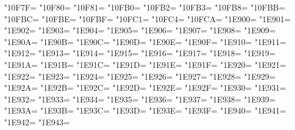 \XeTeXcharclass"10F7F=\KclassArabD
\XeTeXcharclass"10F80=\KclassArabD
\XeTeXcharclass"10F81=\KclassArabD
\XeTeXcharclass"10FB0=\KclassArabD
\XeTeXcharclass"10FB2=\KclassArabD
\XeTeXcharclass"10FB3=\KclassArabD
\XeTeXcharclass"10FB8=\KclassArabD
\XeTeXcharclass"10FBB=\KclassArabD
\XeTeXcharclass"10FBC=\KclassArabD
\XeTeXcharclass"10FBE=\KclassArabD
\XeTeXcharclass"10FBF=\KclassArabD
\XeTeXcharclass"10FC1=\KclassArabD
\XeTeXcharclass"10FC4=\KclassArabD
\XeTeXcharclass"10FCA=\KclassArabD
\XeTeXcharclass"1E900=\KclassArabD
\XeTeXcharclass"1E901=\KclassArabD
\XeTeXcharclass"1E902=\KclassArabD
\XeTeXcharclass"1E903=\KclassArabD
\XeTeXcharclass"1E904=\KclassArabD
\XeTeXcharclass"1E905=\KclassArabD
\XeTeXcharclass"1E906=\KclassArabD
\XeTeXcharclass"1E907=\KclassArabD
\XeTeXcharclass"1E908=\KclassArabD
\XeTeXcharclass"1E909=\KclassArabD
\XeTeXcharclass"1E90A=\KclassArabD
\XeTeXcharclass"1E90B=\KclassArabD
\XeTeXcharclass"1E90C=\KclassArabD
\XeTeXcharclass"1E90D=\KclassArabD
\XeTeXcharclass"1E90E=\KclassArabD
\XeTeXcharclass"1E90F=\KclassArabD
\XeTeXcharclass"1E910=\KclassArabD
\XeTeXcharclass"1E911=\KclassArabD
\XeTeXcharclass"1E912=\KclassArabD
\XeTeXcharclass"1E913=\KclassArabD
\XeTeXcharclass"1E914=\KclassArabD
\XeTeXcharclass"1E915=\KclassArabD
\XeTeXcharclass"1E916=\KclassArabD
\XeTeXcharclass"1E917=\KclassArabD
\XeTeXcharclass"1E918=\KclassArabD
\XeTeXcharclass"1E919=\KclassArabD
\XeTeXcharclass"1E91A=\KclassArabD
\XeTeXcharclass"1E91B=\KclassArabD
\XeTeXcharclass"1E91C=\KclassArabD
\XeTeXcharclass"1E91D=\KclassArabD
\XeTeXcharclass"1E91E=\KclassArabD
\XeTeXcharclass"1E91F=\KclassArabD
\XeTeXcharclass"1E920=\KclassArabD
\XeTeXcharclass"1E921=\KclassArabD
\XeTeXcharclass"1E922=\KclassArabD
\XeTeXcharclass"1E923=\KclassArabD
\XeTeXcharclass"1E924=\KclassArabD
\XeTeXcharclass"1E925=\KclassArabD
\XeTeXcharclass"1E926=\KclassArabD
\XeTeXcharclass"1E927=\KclassArabD
\XeTeXcharclass"1E928=\KclassArabD
\XeTeXcharclass"1E929=\KclassArabD
\XeTeXcharclass"1E92A=\KclassArabD
\XeTeXcharclass"1E92B=\KclassArabD
\XeTeXcharclass"1E92C=\KclassArabD
\XeTeXcharclass"1E92D=\KclassArabD
\XeTeXcharclass"1E92E=\KclassArabD
\XeTeXcharclass"1E92F=\KclassArabD
\XeTeXcharclass"1E930=\KclassArabD
\XeTeXcharclass"1E931=\KclassArabD
\XeTeXcharclass"1E932=\KclassArabD
\XeTeXcharclass"1E933=\KclassArabD
\XeTeXcharclass"1E934=\KclassArabD
\XeTeXcharclass"1E935=\KclassArabD
\XeTeXcharclass"1E936=\KclassArabD
\XeTeXcharclass"1E937=\KclassArabD
\XeTeXcharclass"1E938=\KclassArabD
\XeTeXcharclass"1E939=\KclassArabD
\XeTeXcharclass"1E93A=\KclassArabD
\XeTeXcharclass"1E93B=\KclassArabD
\XeTeXcharclass"1E93C=\KclassArabD
\XeTeXcharclass"1E93D=\KclassArabD
\XeTeXcharclass"1E93E=\KclassArabD
\XeTeXcharclass"1E93F=\KclassArabD
\XeTeXcharclass"1E940=\KclassArabD
\XeTeXcharclass"1E941=\KclassArabD
\XeTeXcharclass"1E942=\KclassArabD
\XeTeXcharclass"1E943=\KclassArabD

